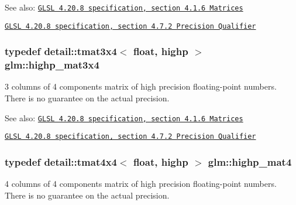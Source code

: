 \begin{Desc}
\item[See also:]\href{http://www.opengl.org/registry/doc/GLSLangSpec.4.20.8.pdf}{\tt GLSL 4.20.8 specification, section 4.1.6 Matrices} 

\href{http://www.opengl.org/registry/doc/GLSLangSpec.4.20.8.pdf}{\tt GLSL 4.20.8 specification, section 4.7.2 Precision Qualifier} \end{Desc}
\hypertarget{group__core__precision_gbaf9c8dd35db715b1093042703f879d0}{
\subsubsection[highp\_\-mat3x4]{\setlength{\rightskip}{0pt plus 5cm}typedef detail::tmat3x4$<$ float, highp $>$ {\bf glm::highp\_\-mat3x4}}}
\label{group__core__precision_gbaf9c8dd35db715b1093042703f879d0}


3 columns of 4 components matrix of high precision floating-point numbers. There is no guarantee on the actual precision.

\begin{Desc}
\item[See also:]\href{http://www.opengl.org/registry/doc/GLSLangSpec.4.20.8.pdf}{\tt GLSL 4.20.8 specification, section 4.1.6 Matrices} 

\href{http://www.opengl.org/registry/doc/GLSLangSpec.4.20.8.pdf}{\tt GLSL 4.20.8 specification, section 4.7.2 Precision Qualifier} \end{Desc}
\hypertarget{group__core__precision_g3067b3b8ce793227a51b2e3c233257d5}{
\subsubsection[highp\_\-mat4]{\setlength{\rightskip}{0pt plus 5cm}typedef detail::tmat4x4$<$ float, highp $>$ {\bf glm::highp\_\-mat4}}}
\label{group__core__precision_g3067b3b8ce793227a51b2e3c233257d5}


4 columns of 4 components matrix of high precision floating-point numbers. There is no guarantee on the actual precision.

